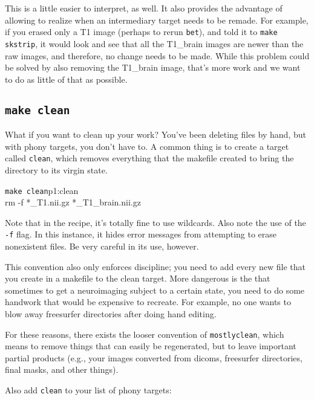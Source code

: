 This is a little easier to interpret, as well. It also provides the advantage of allowing \maken{} to realize when an intermediary target needs to be remade. For example, if you erased only a T1 image (perhaps to rerun \texttt{bet}), and told it to \texttt{make skstrip}, it would look and see that all the T1_brain images are newer than the raw images, and therefore, no change needs to be made. While this problem could be solved by also removing the T1_brain image, that's more work and we want to do as little of that as possible.

\subsection{\texttt{make clean}}

What if you want to clean up your work? You've been deleting files by hand, but with phony targets, you don't have to. A common thing is to create a target called \texttt{clean}, which removes everything that the makefile created to bring the directory to its virgin state.

\begin{make}{\texttt{make clean}}{p1:clean}
	\\
	\tab rm -f *_T1.nii.gz *_T1_brain.nii.gz
\end{make}

Note that in the recipe, it's totally fine to use wildcards. Also note the use of the \texttt{-f} flag. In this instance, it hides error messages from attempting to erase nonexistent files. Be very careful in its use, however.

This convention also only enforces discipline; you need to add every new file that you create in a makefile to the clean target. More dangerous is the that sometimes to get a neuroimaging subject to a certain state, you need to do some handwork that would be expensive to recreate. For example, no one wants to blow away freesurfer directories after doing hand editing. 

For these reasons, there exists the looser convention of \texttt{mostlyclean}, which means to remove things that can easily be regenerated, but to leave important partial products (e.g., your images converted from dicoms, freesurfer directories, final masks, and other things).

Also add \texttt{clean} to your list of phony targets:
